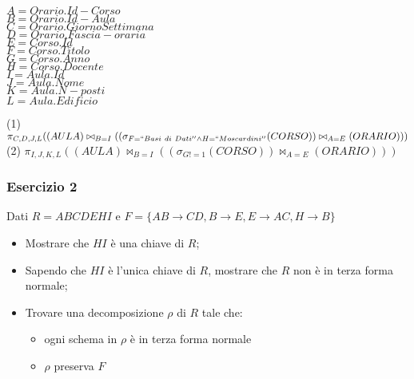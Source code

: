   \begin{multicols}{3}
  \begin{flushleft}
   $A = Orario.Id-Corso$\\
   $B = Orario.Id-Aula$\\
   $C = Orario.GiornoSettimana$\\
   $D = Orario.Fascia-oraria$\\
   $E = Corso.Id$\\
   $F = Corso.Titolo$\\
   $G = Corso.Anno$\\
   $H = Corso.Docente$\\
   $I = Aula.Id$\\
   $J = Aula.Nome$\\
   $K = Aula.N-posti$\\
   $L = Aula.Edificio$\\
  \end{flushleft}
  \end{multicols}

   \noindent(1) $\pi_{C, D, J, L}((AULA)\bowtie_{B=I}((\sigma_{F=``Basi\ di\ Dati'' \wedge H=``Moscardini''}(CORSO))\bowtie_{A=E}(ORARIO)))$\\
   (2) $\pi_{I, J, K, L}((AULA)\bowtie_{B=I}((\sigma_{G!=1}(CORSO))\bowtie_{A=E}(ORARIO)))$\\

  \subsubsection{Esercizio 2}
 Dati $R=ABCDEHI$ e $F=\{AB\rightarrow CD, B\rightarrow E, E\rightarrow AC, H\rightarrow B\}$
 \begin{itemize}
  \item Mostrare che $HI$ è una chiave di $R$;
  \item Sapendo che $HI$ è l'unica  chiave di $R$, mostrare che $R$ non è in terza forma normale;
  \item Trovare una decomposizione $\rho$ di $R$ tale che:
    \begin{itemize}
     \item ogni schema in $\rho$ è in terza forma normale
    \item $\rho$ preserva $F$
    \end{itemize}
 \end{itemize}
 
